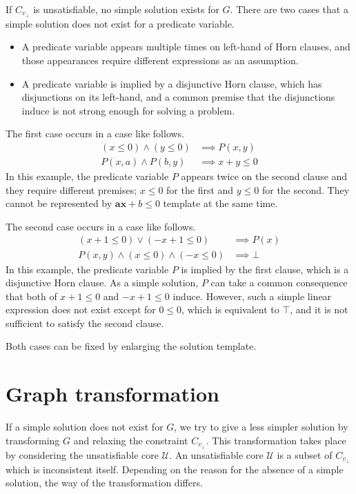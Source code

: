 If $C_{v_\bot}$ is unsatisfiable, no simple solution exists for $G$.
There are two cases that a simple solution does not exist for a
predicate variable.
\begin{itemize}
\item A predicate variable appears multiple times on left-hand of Horn
  clauses, and those appearances require different expressions as an
  assumption.
\item A predicate variable is implied by a disjunctive Horn clause,
  which has disjunctions on its left-hand, and a common premise that
  the disjunctions induce is not strong enough for solving a problem.
\end{itemize}

The first case occurs in a case like follows.
\begin{align*}
\left( x \leq 0 \right) \wedge \left( y \leq 0 \right) & \implies P(x,y) \\
P(x,a) \wedge P(b,y) & \implies x+y \leq 0
\end{align*}
In this example, the predicate variable $P$ appears twice on the
second clause and they require different premises; $x \leq 0$ for the
first and $y \leq 0$ for the second.  They cannot be represented by
$\mathbf{ax} + b \leq 0$ template at the same time.

The second case occurs in a case like follows.
\begin{align*}
\left( x+1 \leq 0 \right) \vee \left( -x+1 \leq 0 \right) & \implies P(x) \\
P(x,y) \wedge \left( x \leq 0 \right) \wedge \left( -x \leq 0 \right) & \implies \bot
\end{align*}
In this example, the predicate variable $P$ is implied by the first
clause, which is a disjunctive Horn clause.  As a simple solution, $P$
can take a common consequence that both of $x+1 \leq 0$ and
$-x+1 \leq 0$ induce.  However, such a simple linear expression does
not exist except for $0 \leq 0$, which is equivalent to $\top$, and it
is not sufficient to satisfy the second clause.

Both cases can be fixed by enlarging the solution template.


\section {Graph transformation}

If a simple solution does not exist for $G$, we try to give a less
simpler solution by transforming $G$ and relaxing the constraint
$C_{v_\bot}$.  This transformation takes place by considering the
unsatisfiable core $\mathcal{U}$.  An unsatisfiable core $\mathcal{U}$
is a subset of $C_{v_\bot}$ which is inconsistent itself.  Depending
on the reason for the absence of a simple solution, the way of the
transformation differs.

